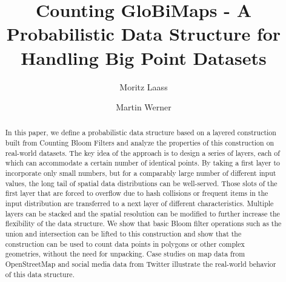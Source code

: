 \documentclass[sigconf, nonacm]{acmart}
\begin{document}
\title{Counting GloBiMaps - A Probabilistic Data Structure for Handling Big Point Datasets}

\author{Moritz Laass}

\author{Martin Werner}



\begin{abstract}
  In this paper, we define a probabilistic data structure based on a layered construction built from Counting Bloom Filters and analyze the properties of this construction on real-world datasets. The key idea of the approach is to design a series of layers, each of which can accommodate a certain number of identical points. By taking a first layer to incorporate only small numbers, but for a comparably large number of different input values, the long tail of spatial data distributions can be well-served. Those slots of the first layer that are forced to overflow due to hash collisions or frequent items in the input distribution are transferred to a next layer of different characteristics. Multiple layers can be stacked and the spatial resolution can be modified to further increase the flexibility of the data structure. We show that basic Bloom filter operations such as the union and intersection can be lifted to this construction and show that the construction can be used to count data points in polygons or other complex geometries, without the need for unpacking. Case studies on map data from OpenStreetMap and social media data from Twitter illustrate the real-world behavior of this data structure.
\end{abstract}

\maketitle
\end{document}
